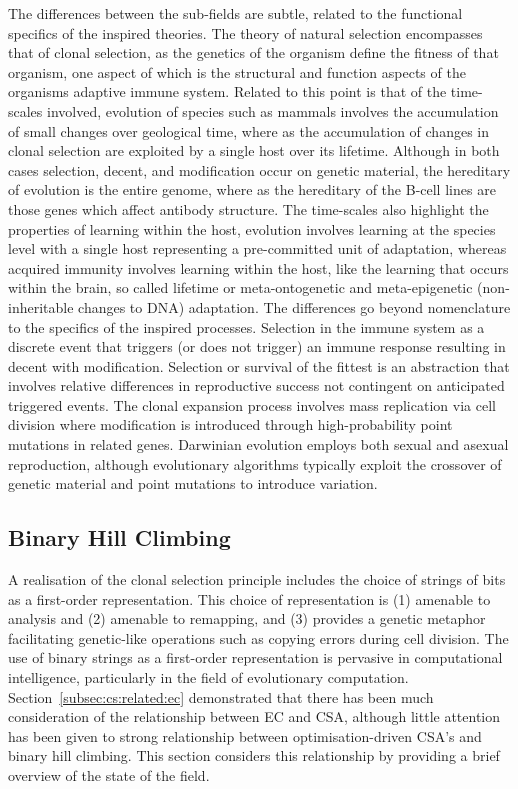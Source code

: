 The differences between the sub-fields are subtle, related to the functional specifics of the inspired theories. The theory of natural selection encompasses that of clonal selection, as the genetics of the organism define the fitness of that organism, one aspect of which is the structural and function aspects of the organisms adaptive immune system. Related to this point is that of the time-scales involved, evolution of species such as mammals involves the accumulation of small changes over geological time, where as the accumulation of changes in clonal selection are exploited by a single host over its lifetime. Although in both cases selection, decent, and modification occur on genetic material, the hereditary of evolution is the entire genome, where as the hereditary of the B-cell lines are those genes which affect antibody structure. The time-scales also highlight the properties of learning within the host, evolution involves learning at the species level with a single host representing a pre-committed unit of adaptation, whereas acquired immunity involves learning within the host, like the learning that occurs within the brain, so called lifetime or meta-ontogenetic and meta-epigenetic (non-inheritable changes to DNA) adaptation. The differences go beyond nomenclature to the specifics of the inspired processes. Selection in the immune system as a discrete event that triggers (or does not trigger) an immune response resulting in decent with modification. Selection or survival of the fittest is an abstraction that involves relative differences in reproductive success not contingent on anticipated triggered events. The clonal expansion process involves mass replication via cell division where modification is introduced through high-probability point mutations in related genes. Darwinian evolution employs both sexual and asexual reproduction, although evolutionary algorithms typically exploit the crossover of genetic material and point mutations to introduce variation.

%
%
\subsection{Binary Hill Climbing}
\label{subsec:cs:related:hillclimbing}
A realisation of the clonal selection principle includes the choice of strings of bits as a first-order representation. This choice of representation is (1) amenable to analysis and (2) amenable to remapping, and (3) provides a genetic metaphor facilitating genetic-like operations such as copying errors during cell division. The use of binary strings as a first-order representation is pervasive in computational intelligence, particularly in the field of evolutionary computation. Section~\ref{subsec:cs:related:ec} demonstrated that there has been much consideration of the relationship between EC and CSA, although little attention has been given to strong relationship between optimisation-driven CSA's and binary hill climbing. This section considers this relationship by providing a brief overview of the state of the field.

